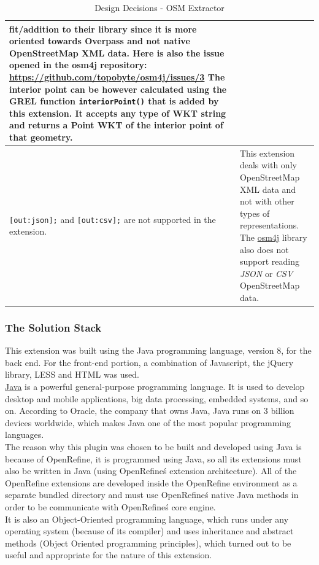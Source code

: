 \begin{table}
\begin{tabularx}{\textwidth}{| X | X |}
        fit/addition to their library since it is more oriented towards Overpass and not native OpenStreetMap XML data.
        Here is also the issue opened in the osm4j repository: \href{https://github.com/topobyte/osm4j/issues/3}{https://github.com/topobyte/osm4j/issues/3}
        The interior point can be however calculated using the GREL function \texttt{interiorPoint()} that is added by this extension.
        It accepts any type of WKT string and returns a Point WKT of the interior point of that geometry.\\
        \hline
        \texttt{[out:json];} and \texttt{[out:csv];} are not supported in the extension. & This extension deals with only OpenStreetMap
        XML data and not with other types of representations. The \href{https://github.com/topobyte/osm4j}{osm4j} library also does not support reading
        \textit{JSON} or \textit{CSV} OpenStreetMap data.
    \end{tabularx}
\caption{Design Decisions - OSM Extractor}
\end{table}
\subsubsection{The Solution Stack}
This extension was built using the Java programming language, version 8, for the back end. For the front-end portion,
a combination of Javascript, the jQuery library, LESS and HTML was used. \\
\newline
\href{https://www.java.com/en/}{Java} is a powerful general-purpose programming language.
It is used to develop desktop and mobile applications,
big data processing, embedded systems, and so on.
According to Oracle, the company that owns Java, Java runs on 3 billion devices worldwide, which makes Java one of the most popular programming languages. \cite{WhatIsJava}\\
\newline
The reason why this plugin was chosen to be built and developed using Java is
because of OpenRefine, it is programmed using Java,
so all its extensions must also be written in Java (using OpenRefine\'s extension
architecture). All of the OpenRefine extensions are developed inside the
OpenRefine environment as a separate bundled directory and must use OpenRefine\'s
native Java methods in order to be communicate with OpenRefine\'s core engine.\\
It is also an Object-Oriented programming language, which runs under any operating system
(because of its compiler) and uses inheritance and abstract methods (Object Oriented programming principles),
which turned out to be useful and appropriate for the nature of this extension.\\
\newline

